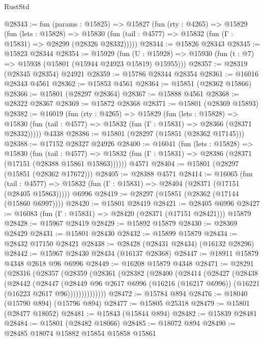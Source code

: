\begin{lexlean}{RustStd}
\begin{coremodule}
@28343 := fun (params : @15825) =>
  @15827
    (fun (rty : @4265) =>
    @15829
      (fun (lets : @15828) =>
      @15830 (fun (tail : @4577) => @15832 (fun (Γ : @15831) => @28299 (@28326 @28332)))))
@28344 := @15826 @28343
@28345 := @15823 @28344
@28354 := @15929
    (fun (U : @15928) => @15930 (fun (t : @7) => @15938 (@15801 (@15944 @24923 @15819) @15955)))
@28357 := @28319 (@28345 @28354) @24921
@28359 := @15786 @28344 @28354
@28361 := @16016 @28343 @4561
@28362 := @15853 @4561
@28364 := @15851 (@28362 @15866)
@28366 := @15801 (@28297 @28364)
@28367 := @15888 @4561
@28368 := @28322 @28367
@28369 := @15872 @28368
@28371 := @15801 (@28369 @15893)
@28382 := @16019
    (fun (rty : @4265) =>
    @15829
      (fun (lets : @15828) =>
      @15830 (fun (tail : @4577) => @15832 (fun (Γ : @15831) => @28366 (@28371 @28332)))))
    @4338
@28386 := @15801 (@28297 (@15851 (@28362 @17145)))
@28388 := @17152 @28327 @24926
@28400 := @16041
    (fun (lets : @15828) =>
    @15830
      (fun (tail : @4577) =>
      @15832 (fun (Γ : @15831) => @28386 (@28371 (@17151 (@28388 @15861 @15863))))))
    @4571
@28404 := @15801 (@28297 (@15851 (@28362 @17672)))
@28405 := @28388 @4571
@28414 := @16065
    (fun (tail : @4577) => @15832 (fun (Γ : @15831) => @28404 (@28371 (@17151 (@28405 @15863)))))
    @6996
@28419 := @28297 (@15851 (@28362 (@17144 (@15860 @6997))))
@28420 := @15801 @28419
@28421 := @28405 @6996
@28427 := @16083 (fun (Γ : @15831) => @28420 (@28371 (@17151 @28421))) @15879
@28428 := @15967 @28419
@28429 := @15892 @15879
@28430 := @28369 @28429
@28431 := @15801 @28430
@28432 := @15899 @15879
@28434 := @28432 @17150 @28421
@28438 := @28428 (@28431 @28434) (@16132 @28296)
@28442 := @15967 @28430 @28434 (@16137 @28368)
@28447 := @18911 @15879 @4348 @2618 @96 @6996
@28449 := @16208 @15879 @4348
@28471 := @28291
    (@28316
      (@28357
        (@28359
          (@28361
            (@28382
              (@28400
                (@28414
                  (@28427
                    (@28438
                      (@28442
                        (@28447
                          (@28449
                            @96
                            @2617
                            @6996
                            (@16216 (@16217 @6996))
                            (@16221 (@16223 @2617 @96))))))))))))))
@28472 := @15784 @894
@28476 := @18040 (@15790 @894) (@15796 @894)
@28477 := @15805 @25318
@28479 := @15801 (@28477 @18052)
@28481 := @15843 (@15844 @894)
@28482 := @15839 @28481
@28484 := @15801 (@28482 @18066)
@28485 := @18072 @894
@28490 := @28485 @18074 @15882 @15854 @15858 @15861

\end{coremodule}
\end{lexlean}
